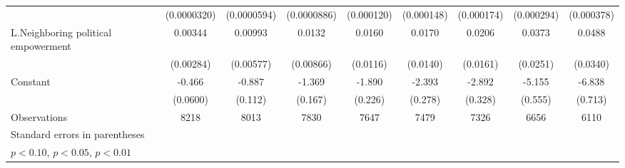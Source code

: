 \begin{table}[htbp]
\begin{tabular}{l*{8}{c}}
                    & (0.0000320)         & (0.0000594)         & (0.0000886)         &  (0.000120)         &  (0.000148)         &  (0.000174)         &  (0.000294)         &  (0.000378)         \\
[1em]
L.Neighboring political empowerment&     0.00344         &     0.00993\sym{*}  &      0.0132         &      0.0160         &      0.0170         &      0.0206         &      0.0373         &      0.0488         \\
                    &   (0.00284)         &   (0.00577)         &   (0.00866)         &    (0.0116)         &    (0.0140)         &    (0.0161)         &    (0.0251)         &    (0.0340)         \\
[1em]
Constant            &      -0.466\sym{***}&      -0.887\sym{***}&      -1.369\sym{***}&      -1.890\sym{***}&      -2.393\sym{***}&      -2.892\sym{***}&      -5.155\sym{***}&      -6.838\sym{***}\\
                    &    (0.0600)         &     (0.112)         &     (0.167)         &     (0.226)         &     (0.278)         &     (0.328)         &     (0.555)         &     (0.713)         \\
\hline
Observations        &        8218         &        8013         &        7830         &        7647         &        7479         &        7326         &        6656         &        6110         \\
\hline\hline
\multicolumn{9}{l}{\footnotesize Standard errors in parentheses}\\
\multicolumn{9}{l}{\footnotesize \sym{*} \(p<0.10\), \sym{**} \(p<0.05\), \sym{***} \(p<0.01\)}\\
\end{tabular}
\end{table}
